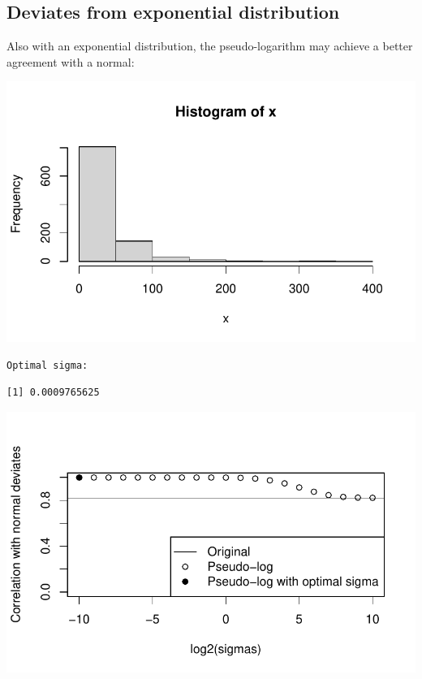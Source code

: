 \documentclass[
  letterpaper,
  DIV=11,
  numbers=noendperiod]{scrreport}
\begin{document}
\hypertarget{deviates-from-exponential-distribution}{%
\subsection{Deviates from exponential
distribution}\label{deviates-from-exponential-distribution}}

Also with an exponential distribution, the pseudo-logarithm may achieve
a better agreement with a normal:

\includegraphics{./Pseudo_log_explainer_files/figure-pdf/pl07-1.pdf}

\begin{verbatim}
Optimal sigma: 
\end{verbatim}

\begin{verbatim}
[1] 0.0009765625
\end{verbatim}

\includegraphics{./Pseudo_log_explainer_files/figure-pdf/pl07-2.pdf}
\end{document}

